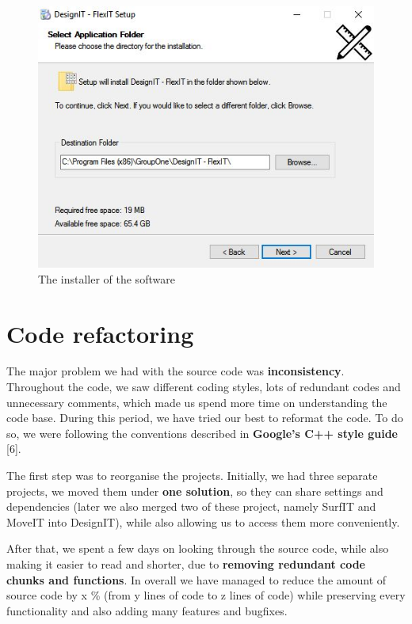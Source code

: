 \documentclass[a4paper, 11pt, article]{report}
\begin{document}
\begin{figure}[H]
\includegraphics[width=13cm]{images/setup}
\caption{The installer of the software}
\centering
\end{figure}

\section{Code refactoring}

The major problem we had with the source code was \textbf{inconsistency}. Throughout the code, we saw different coding styles, lots of redundant codes and unnecessary comments, which made us spend more time on understanding the code base. During this period, we have tried our best to reformat the code. To do so, we were following the conventions described in \textbf{Google's C++ style guide} [6]. 

The first step was to reorganise the projects. Initially, we had three separate projects, we moved them under \textbf{one solution}, so they can share settings and dependencies (later we also merged two of these project, namely SurfIT and MoveIT into DesignIT), while also allowing us to access them more conveniently.

After that, we spent a few days on looking through the source code, while also making it easier to read and shorter, due to \textbf{removing redundant code chunks and functions}. In overall we have managed to reduce the amount of source code by x \% (from y lines of code to z lines of code) while preserving every functionality and also adding many features and bugfixes.
\end{document}
